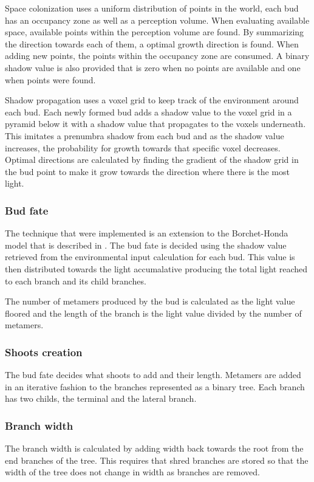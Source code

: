 \documentclass[11pt]{article} %
\begin{document}
Space colonization uses a uniform distribution of points in the world, each bud has an occupancy zone as well as a perception volume.
When evaluating available space, available points within the perception volume are found.
By summarizing the direction towards each of them, a optimal growth direction is found.
When adding new points, the points within the occupancy zone are consumed.
A binary shadow value is also provided that is zero when no points are available and one when points were found.

Shadow propagation uses a voxel grid to keep track of the environment around each bud.
Each newly formed bud adds a shadow value to the voxel grid in a pyramid below it with a shadow value that propagates to the voxels underneath.
This imitates a prenumbra shadow from each bud and as the shadow value increases, the probability for growth towards that specific voxel decreases.
Optimal directions are calculated by finding the gradient of the shadow grid in the bud point to make it grow towards the direction where there is the most light.

\subsubsection{Bud fate}
The technique that were implemented is an extension to the Borchet-Honda model that is described in \citet{palubicki}.
The bud fate is decided using the shadow value retrieved from the environmental input calculation for each bud.
This value is then distributed towards the light accumalative producing the total light reached to each branch and its child branches.

The number of metamers produced by the bud is calculated as the light value floored and the length of the branch is the light value divided by the number of metamers.

\subsubsection{Shoots creation}
The bud fate decides what shoots to add and their length.
Metamers are added in an iterative fashion to the branches represented as a binary tree.
Each branch has two childs, the terminal and the lateral branch.

\subsubsection{Branch width}
The branch width is calculated by adding width back towards the root from the end branches of the tree.
This requires that shred branches are stored so that the width of the tree does not change in width as branches are removed.
\end{document}
